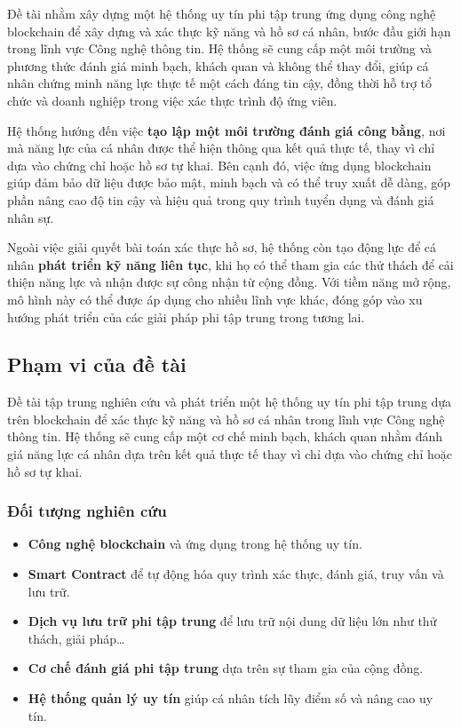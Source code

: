 \documentclass{article}[14pt]
\begin{document}
{  Đề tài nhằm xây dựng một hệ thống uy tín phi tập trung ứng dụng công nghệ blockchain để xây dựng và xác thực kỹ năng và hồ sơ cá nhân, bước đầu giới hạn trong lĩnh vực Công nghệ thông tin.
  Hệ thống sẽ cung cấp một môi trường và phương thức đánh giá minh bạch, khách quan và không thể thay đổi, giúp cá nhân chứng minh năng lực thực tế một cách đáng tin cậy,
  đồng thời hỗ trợ tổ chức và doanh nghiệp trong việc xác thực trình độ ứng viên.

  Hệ thống hướng đến việc \textbf{tạo lập một môi trường đánh giá công bằng}, nơi mà năng lực của cá nhân được thể hiện thông qua kết quả thực tế,
  thay vì chỉ dựa vào chứng chỉ hoặc hồ sơ tự khai. Bên cạnh đó, việc ứng dụng blockchain giúp đảm bảo dữ liệu được bảo mật,
  minh bạch và có thể truy xuất dễ dàng, góp phần nâng cao độ tin cậy và hiệu quả trong quy trình tuyển dụng và đánh giá nhân sự.

  Ngoài việc giải quyết bài toán xác thực hồ sơ, hệ thống còn tạo động lực để cá nhân \textbf{phát triển kỹ năng liên tục}, khi họ có thể tham gia các thử thách
  để cải thiện năng lực và nhận được sự công nhận từ cộng đồng. Với tiềm năng mở rộng, mô hình này có thể được áp dụng cho nhiều lĩnh vực khác,
  đóng góp vào xu hướng phát triển của các giải pháp phi tập trung trong tương lai.

  \subsection{Phạm vi của đề tài}

  Đề tài tập trung nghiên cứu và phát triển một hệ thống uy tín phi tập trung dựa trên blockchain để xác thực kỹ năng và hồ sơ cá nhân trong lĩnh vực Công nghệ thông tin.
  Hệ thống sẽ cung cấp một cơ chế minh bạch, khách quan nhằm đánh giá năng lực cá nhân dựa trên kết quả thực tế thay vì chỉ dựa vào chứng chỉ hoặc hồ sơ tự khai.

  \subsubsection{Đối tượng nghiên cứu}
  \begin{itemize}
      \item \textbf{Công nghệ blockchain} và ứng dụng trong hệ thống uy tín.
      \item \textbf{Smart Contract} để tự động hóa quy trình xác thực, đánh giá, truy vấn và lưu trữ.
      \item \textbf{Dịch vụ lưu trữ phi tập trung} để lưu trữ nội dung dữ liệu lớn như thử thách, giải pháp\dots
      \item \textbf{Cơ chế đánh giá phi tập trung} dựa trên sự tham gia của cộng đồng.
      \item \textbf{Hệ thống quản lý uy tín} giúp cá nhân tích lũy điểm số và nâng cao uy tín.
  \end{itemize}

}
\end{document}
